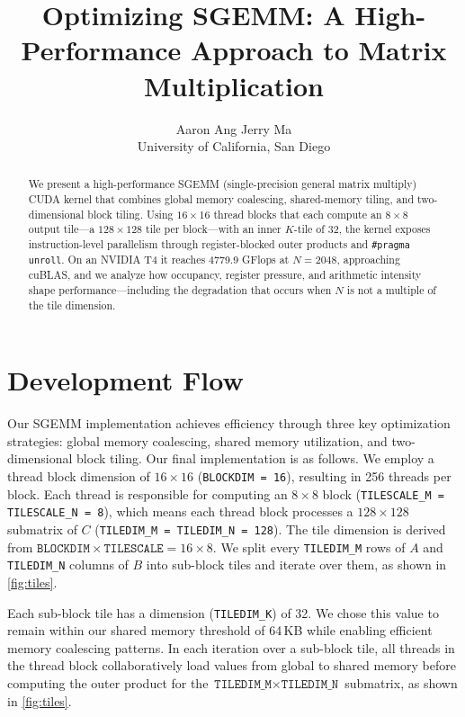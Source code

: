 \documentclass[letterpaper,twocolumn,10pt]{article}
\date{}
\title{\Large \bf Optimizing SGEMM: A High-Performance Approach to Matrix
  Multiplication}
\author{
{\rm Aaron Ang \quad Jerry Ma}\\
University of California, San Diego
}
\begin{document}
\maketitle

\begin{abstract}
We present a high-performance SGEMM (single-precision general matrix multiply)
CUDA kernel that combines global memory coalescing, shared-memory tiling, and
two-dimensional block tiling. Using $16\times16$ thread blocks that each compute an
$8\times8$ output tile---a $128\times128$ tile per block---with an inner $K$-tile of
32, the kernel exposes instruction-level parallelism through register-blocked outer
products and \texttt{\#pragma unroll}. On an NVIDIA T4 it reaches 4779.9 GFlops at
$N=2048$, approaching cuBLAS, and we analyze how occupancy, register pressure, and
arithmetic intensity shape performance---including the degradation that occurs when
$N$ is not a multiple of the tile dimension.
\end{abstract}

\section{Development Flow}

Our SGEMM implementation achieves efficiency through three key optimization
strategies: global memory coalescing, shared memory utilization, and
two-dimensional block tiling. Our final implementation is as follows. We employ a
thread block dimension of $16\times16$ (\texttt{BLOCKDIM = 16}), resulting in 256
threads per block. Each thread is responsible for computing an $8\times8$ block
(\texttt{TILESCALE\_M = TILESCALE\_N = 8}), which means each thread block processes a
$128\times128$ submatrix of $C$ (\texttt{TILEDIM\_M = TILEDIM\_N = 128}). The tile
dimension is derived from $\texttt{BLOCKDIM}\times\texttt{TILESCALE} = 16\times8$. We
split every \texttt{TILEDIM\_M} rows of $A$ and \texttt{TILEDIM\_N} columns of $B$
into sub-block tiles and iterate over them, as shown in \cref{fig:tiles}.

Each sub-block tile has a dimension (\texttt{TILEDIM\_K}) of 32. We chose this value
to remain within our shared memory threshold of 64\,KB while enabling efficient
memory coalescing patterns. In each iteration over a sub-block tile, all threads in
the thread block collaboratively load values from global to shared memory before
computing the outer product for the $\texttt{TILEDIM\_M}\times\texttt{TILEDIM\_N}$
submatrix, as shown in \cref{fig:tiles}.
\end{document}
